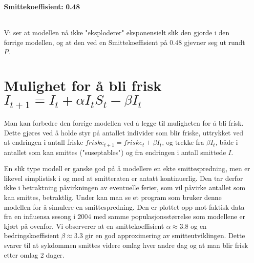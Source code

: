 \documentclass[12pt]{article}
\begin{document}
\begin{center}
    \large{\textbf{Smittekoeffisient: 0.48}}\\
    \hphantom{---------}\\
    \hphantom{---------}
\end{center}

Vi ser at modellen nå ikke "eksploderer" eksponensielt slik den gjorde i den forrige modellen, og at 
den ved en Smittekoeffisient på 0.48 gjevner seg ut rundt $P$.

\section{Mulighet for å bli frisk $I_{t+1} = I_t + \alpha I_t S_t - \beta I_t$}
Man kan forbedre den forrige modellen ved å legge til muligheten for å bli frisk. Dette gjøres ved å holde styr på antallet individer 
som blir friske, uttrykket ved at endringen i antall friske $friske_{t+1} = friske_t + \beta I_t$, og trekke fra $\beta I_t$, både i 
antallet som kan smittes ("suseptables") og fra endringen i antall smittede $I$.  

En slik type modell er ganske god på å modellere en ekte smittespredning, men er likevel simplistisk i og med at smitteraten er antatt 
kontinuerlig. Den tar derfor ikke i betraktning påvirkningen av eventuelle ferier, som vil påvirke antallet som kan smittes, betraktlig.
Under kan man se et program som bruker denne modellen for å simulere en smittespredning. Den er plottet opp mot faktisk data fra en 
influensa sesong i 2004 med samme populasjonsstørrelse som modellene er kjørt på ovenfor. Vi observerer at en smittekoeffisient
$\alpha \approx 3.8$ og en bedringskoeffisient $\beta \approx 3.3$ gir en god approximering av smitteutviklingen. Dette svarer til at 
sykdommen smittes videre omlag hver andre dag og at man blir frisk etter omlag 2 dager.
\end{document}
